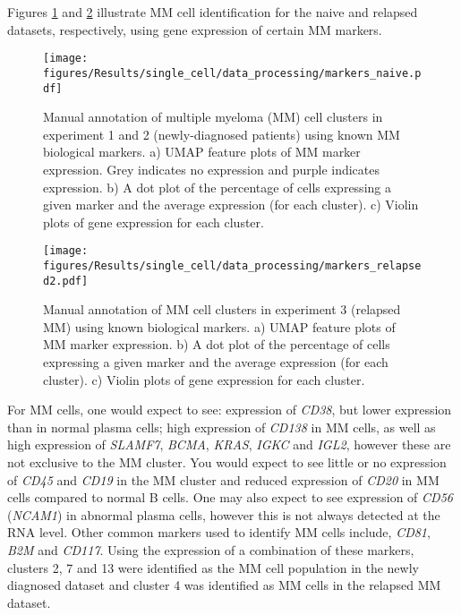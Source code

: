 Figures \ref{fig:mm_markers_naive} and \ref{fig:mm_markers_relapsed} illustrate MM cell identification for the naive and relapsed datasets, respectively, using gene expression of certain MM markers.
\begin{figure}[p]
    \centering
    \texttt{[image: figures/Results/single\_cell/data\_processing/markers\_naive.pdf]}
    \caption[MM cluster identification- newly diagnosed MM]{Manual annotation of multiple myeloma (MM) cell clusters in experiment 1 and 2 (newly-diagnosed patients) using known MM biological markers.
    a) UMAP feature plots of MM marker expression.
    Grey indicates no expression and purple indicates expression.
    b) A dot plot of the percentage of cells expressing a given marker and the average expression (for each cluster).
    c) Violin plots of gene expression for each cluster.}
    \label{fig:mm_markers_naive}
\end{figure}
%
\begin{figure}[p]
    \centering
    \texttt{[image: figures/Results/single\_cell/data\_processing/markers\_relapsed2.pdf]}
    \caption[MM cluster identification- relapsed MM]{Manual annotation of MM cell clusters in experiment 3 (relapsed MM) using known biological markers.
    a) UMAP feature plots of MM marker expression.
    b) A dot plot of the percentage of cells expressing a given marker and the average expression (for each cluster).
    c) Violin plots of gene expression for each cluster. }
    \label{fig:mm_markers_relapsed}
\end{figure}
%
For MM cells, one would expect to see: expression of \textit{CD38}, but lower expression than in normal plasma cells;
high expression of \textit{CD138} in MM cells, as well as high expression of \textit{SLAMF7}, \textit{BCMA}, \textit{KRAS}, \textit{IGKC} and \textit{IGL2}, however these are not exclusive to the MM cluster.
You would expect to see little or no expression of \textit{CD45} and \textit{CD19} in the MM cluster and reduced expression of \textit{CD20} in MM cells compared to normal B cells.
One may also expect to see expression of \textit{CD56} (\textit{NCAM1}) in abnormal plasma cells, however this is not always detected at the RNA level.
Other common markers used to identify MM cells include, \textit{CD81}, \textit{B2M} and \textit{CD117}.
Using the expression of a combination of these markers, clusters 2, 7 and 13 were identified as the MM cell population in the newly diagnosed dataset and cluster 4 was identified as MM cells in the relapsed MM dataset.

